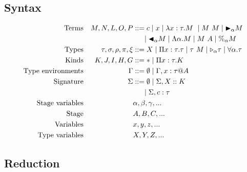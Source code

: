 \subsection{Syntax}

\begin{align*}
    \textrm{Terms}             &  & M,N,L,O,P                & ::= c \mid x \mid \lambda x:\tau.M\ \mid M\ M \mid \TB_\alpha M                                \\
    &  &                          & \ \ \ \ \mid \TBL_\alpha M \mid \Lambda\alpha.M \mid M\ A \mid \%_\alpha M \\ %
    \textrm{Types}             &  & \tau,\sigma,\rho,\pi,\xi & ::= X \mid \Pi x:\tau.\tau \mid \tau\ M \mid \TW_{\alpha} \tau \mid \F\alpha.\tau                 \\
    \textrm{Kinds}             &  & K,J,I,H,G                & ::= * \mid \Pi x:\tau.K                                                                        \\
    \textrm{Type environments} &  & \Gamma                   & ::= \emptyset \mid \Gamma,x:\tau@A                                                             \\
    \textrm{Signature}         &  & \Sigma                   & ::= \emptyset \mid \Sigma,X::K                                                                 \\
    &  &                          & \ \ \ \ \mid \Sigma,c:\tau                                                                     \\
    \textrm{Stage variables}   &  &                          & \alpha,\beta,\gamma,...                                                                        \\
    \textrm{Stage}             &  &                          & A,B,C,...                                                                                      \\
    \textrm{Variables}         &  &                          & x,y,z,...                                                                                      \\
    \textrm{Type variables}    &  &                          & X,Y,Z,...                                                                                      \\
\end{align*}

\subsection{Reduction}

